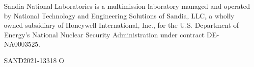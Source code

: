 \documentclass[letterpaper]{scrartcl}
\begin{document}
\vspace*{\fill}
\noindent
Sandia National Laboratories is a multimission laboratory managed and
operated by National Technology and Engineering Solutions of Sandia,
LLC, a wholly owned subsidiary of Honeywell International, Inc., for
the U.S. Department of Energy's National Nuclear Security
Administration under contract DE-NA0003525.

SAND2021-13318 O
\end{document}
